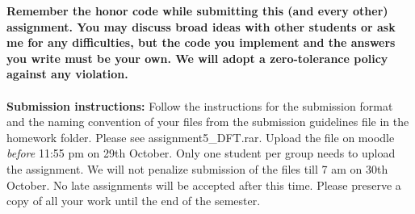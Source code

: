 \documentclass[11pt]{article}
\begin{document}
\maketitle

\textbf{Remember the honor code while submitting this (and every other) assignment. You may discuss broad ideas with other students or ask me for any difficulties, but the code you implement and the answers you write must be your own. We will adopt a \textbf{zero-tolerance policy} against any violation.}
\\
\\
\textbf{Submission instructions:} Follow the instructions for the submission format and the naming convention of your files from the submission guidelines file in the homework folder. Please see \textsf{assignment5\_DFT.rar}. Upload the file on moodle \emph{before} 11:55 pm on 29th October.  Only one student per group needs to upload the assignment. We will not penalize submission of the files till 7 am on 30th October. No late assignments will be accepted after this time. Please preserve a copy of all your work until the end of the semester.  
\end{document}
